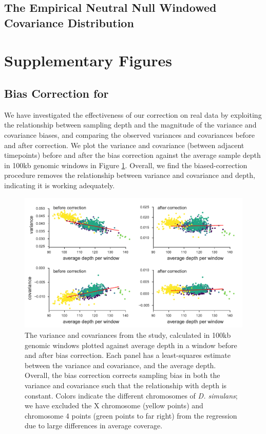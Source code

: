 \documentclass[11pt]{article}
\begin{document}
\subsection{The Empirical Neutral Null Windowed Covariance Distribution}
\label{supp:empirical-null}

\section{Supplementary Figures}


\subsection{Bias Correction for \textcite{Barghi2019-qy}}

We have investigated the effectiveness of our correction on real data by
exploiting the relationship between sampling depth and the magnitude of the
variance and covariance biases, and comparing the observed variances and
covariances before and after correction. We plot the variance and covariance
(between adjacent timepoints) before and after the bias correction against the
average sample depth in 100kb genomic windows in Figure
\ref{suppfig:barghi-correction}. Overall, we find the biased-correction
procedure removes the relationship between variance and covariance and depth, indicating it is working adequately.

\begin{figure}[!ht]
  \centering
  \includegraphics[]{figures/barghi-correction-plot.pdf}

  \caption{The variance and covariances from the \textcite{Barghi2019-qy}
    study, calculated in 100kb genomic windows plotted against average depth in
    a window before and after bias correction.  Each panel has a least-squares
    estimate between the variance and covariance, and the average depth.
    Overall, the bias correction corrects sampling bias in both the variance
    and covariance such that the relationship with depth is constant. Colors
    indicate the different chromosomes of \emph{D. simulans}; we have excluded
  the X chromosome (yellow points) and chromosome 4 points (green points to far
right) from the regression due to large differences in average coverage.}

  \label{suppfig:barghi-correction}
\end{figure}
\end{document}
